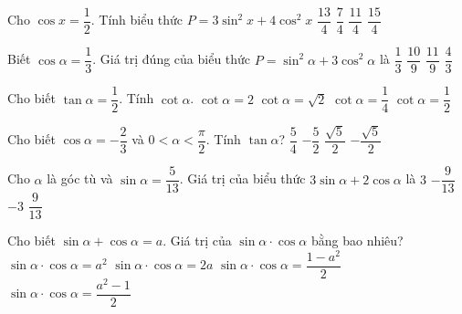\begin{ex}%
	Cho $\cos x=\dfrac 12$. Tính biểu thức $P=3\sin^2x+4\cos^2x$ 
	\choice
	{\True $\dfrac{13}{4}$}
	{$\dfrac{7}{4}$}
	{$\dfrac{11}{4}$}
	{$\dfrac{15}{4}$}
\end{ex}
\begin{ex}%
	Biết $\cos\alpha=\dfrac 13$. Giá trị đúng của biểu thức $P=\sin^2\alpha+3\cos^2\alpha$ là 
	\choice
	{$\dfrac{1}{3}$}
	{$\dfrac{10}{9}$}
	{\True $\dfrac{11}{9}$}
	{$\dfrac{4}{3}$}
\end{ex}
\begin{ex}%
	Cho biết $\tan\alpha=\dfrac{1}{2}$. Tính $\cot\alpha$. 
	\choice
	{\True $\cot\alpha=2$}
	{$\cot\alpha=\sqrt{2}$}
	{$\cot\alpha=\dfrac{1}{4}$}
	{$\cot\alpha=\dfrac{1}{2}$}
\end{ex}
\begin{ex}%
	Cho biết $\cos\alpha=-\dfrac{2}{3}$ và $0<\alpha<\dfrac{\pi}{2}$. Tính $\tan\alpha$?
	\choice
	{$\dfrac{5}{4}$}
	{$-\dfrac{5}{2}$}
	{$\dfrac{\sqrt{5}}{2}$}
	{\True $-\dfrac{\sqrt{5}}{2}$}
\end{ex}
\begin{ex}%
	Cho $\alpha$ là góc tù và $\sin\alpha=\dfrac{5}{13}$. Giá trị của biểu thức $3\sin\alpha+2\cos\alpha$ là
	\choice
	{$3$}
	{\True $-\dfrac{9}{13}$}
	{$-3$}
	{$\dfrac{9}{13}$}
\end{ex}
\begin{ex}%
	Cho biết $\sin\alpha+\cos\alpha=a$. Giá trị của $\sin\alpha\cdot\cos\alpha$ bằng bao nhiêu?
	\choice
	{$\sin\alpha\cdot\cos\alpha=a^2$}
	{$\sin\alpha\cdot\cos\alpha=2a$}
	{$\sin\alpha\cdot\cos\alpha=\dfrac{1-a^2}{2}$}
	{\True $\sin\alpha\cdot\cos\alpha=\dfrac{a^2-1}{2}$}
\end{ex}
